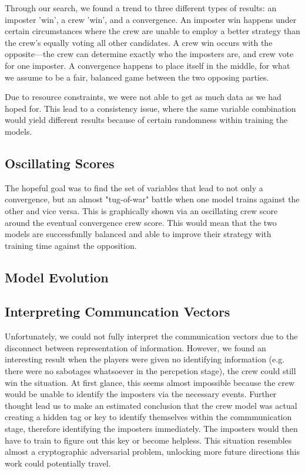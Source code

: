 \documentclass[10pt,twocolumn,letterpaper]{article}
\begin{document}
Through our search, we found a trend to three different types of results:
an imposter 'win', a crew 'win', and a convergence.
An imposter win happens under certain circumstances where the crew are unable
to employ a better strategy than the crew's equally voting all other candidates.
A crew win occurs with the opposite---the crew can determine exactly who the imposters
are, and crew vote for one imposter. A convergence happens to place itself in the middle,
for what we assume to be a fair, balanced game between the two opposing parties.

Due to resource constraints, we were not able to get as much 
data as we had hoped for.
This lead to a consistency issue, where the same variable combination would yield
different results because of certain randomness within training the models.

\subsection{Oscillating Scores}
The hopeful goal was to find the set of variables that lead to not only a convergence,
but an almost "tug-of-war" battle when one model trains against the other and vice versa.
This is graphically shown via an oscillating crew score around the 
eventual convergence crew score. This would mean that the two models
are successfunlly balanced and able to improve their strategy with training time against
the opposition.

\subsection{Model Evolution}
\subsection{Interpreting Communcation Vectors}
Unfortunately, we could not fully interpret the communication vectors due to the
disconnect between representation of information. However, we found an 
interesting result when the players were given no identifying information (e.g. 
there were no sabotages whatsoever in the percpetion stage), the crew could still
win the situation. At first glance, this seems almost impossible because the crew would
be unable to identify the imposters via the necessary events. Further thought lead us
to make an estimated conclusion that the crew model was actual creating a hidden tag or key
to identify themselves within the commmunication stage, therefore identifying the imposters 
immediately. The imposters would then have to train to figure out this key or
become helpless. This situation resembles almost a cryptographic adversarial problem,
unlocking more future directions this work could potentially travel.
\end{document}
